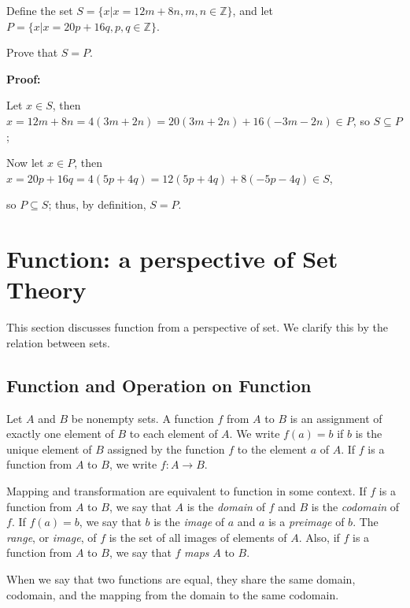 \begin{exercise}
    Define the set $S = \{x | x = 12m + 8n, m,n \in \mathbb{Z}\}$, and let $P = \{x | x = 20p + 16q, p,q \in \mathbb{Z}\}$.

Prove that $S = P$.
\end{exercise}
\textbf{Proof:}

Let $x \in S$, then $x = 12m + 8n = 4(3m + 2n) = 20(3m + 2n) + 16(-3m - 2n) \in P$, so $S \subseteq P$;

Now let $x \in P$, then $x = 20p + 16q = 4(5p + 4q) = 12(5p + 4q) + 8(-5p - 4q) \in S$,

so $P \subseteq S$; thus, by definition, $S = P$.
\section{Function: a perspective of Set Theory}
This section discusses function from a perspective of set. We clarify this by the relation between sets.
\subsection{Function and Operation on Function}
\begin{definition}[Function]

Let \( A \) and \( B \) be nonempty sets. A function \( f \) from \( A \) to \( B \) is an assignment of exactly one element of \( B \) to each element of \( A \). We write \( f(a) = b \) if \( b \) is the unique element of \( B \) assigned by the function \( f \) to the element \( a \) of \( A \). If \( f \) is a function from \( A \) to \( B \), we write \( f : A \rightarrow B \).
    
\end{definition}
\begin{remark}
    Mapping and transformation are equivalent to function in some context. If \( f \) is a function from \( A \) to \( B \), we say that \( A \) is the \emph{domain} of \( f \) and \( B \) is the \emph{codomain} of \( f \). If \( f(a) = b \), we say that \( b \) is the \emph{image} of \( a \) and \( a \) is a \emph{preimage} of \( b \). The \emph{range}, or \emph{image}, of \( f \) is the set of all images of elements of \( A \). Also, if \( f \) is a function from \( A \) to \( B \), we say that \( f \) \emph{maps} \( A \) to \( B \).
\end{remark}

When we say that two functions are equal, they share the same domain, codomain, and the mapping from the domain to the same codomain.


